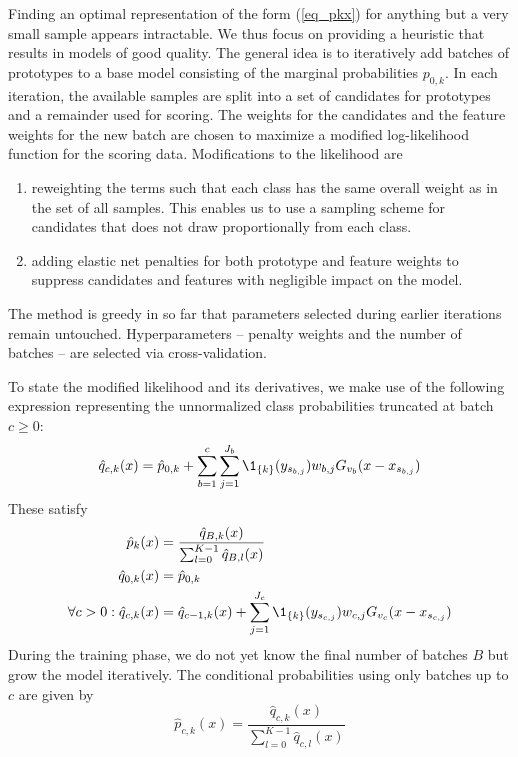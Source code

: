 %
Finding an optimal representation of the form (\ref{eq_pkx}) for anything but a very small sample appears intractable.
We thus focus on providing a heuristic that results in models of good quality.
The general idea is to iteratively add batches of prototypes to a base model consisting of the marginal probabilities $p_{0,k}$.
In each iteration, the available samples are split into a set of candidates for prototypes and a remainder used for scoring.
The weights for the candidates and the feature weights for the new batch are chosen to maximize a modified log-likelihood function for the scoring data.
Modifications to the likelihood are
%
\begin{enumerate}
\item reweighting the terms such that each class has the same overall weight as in the set of all samples.
This enables us to use a sampling scheme for candidates that does not draw proportionally from each class.
%
\item adding elastic net penalties for both prototype and feature weights to suppress candidates and features with negligible impact on the model.
\end{enumerate}
%
The method is greedy in so far that parameters selected during earlier iterations remain untouched.
Hyperparameters -- penalty weights and the number of batches -- are selected via cross-validation.\par
%
To state the modified likelihood and its derivatives, we make use of the following expression representing the unnormalized class probabilities truncated at batch $c\geq0$:
%
\begin{equation}
\hat{q}_{c,k}(x)=\hat{p}_{0,k}
+\sum_{b=1}^c\sum_{j=1}^{J_b}\1_{\{k\}}(y_{s_{b,j}})w_{b,j}G_{v_b}(x-x_{s_{b,j}})
\label{eq_qckx}
\end{equation}
%
These satisfy
%
\begin{align}
\hat{p}_{k}(x)&=\frac{\hat{q}_{B,k}(x)}{\sum_{l=0}^{K-1}\hat{q}_{B,l}(x)}\label{eq_q_properties}\\
\hat{q}_{0,k}(x)&=\hat{p}_{0,k}\notag\\
\forall c>0:\hat{q}_{c,k}(x)&
=\hat{q}_{c-1,k}(x)+\sum_{j=1}^{J_c}\1_{\{k\}}(y_{s_{c,j}})w_{c,j}G_{v_c}(x-x_{s_{c,j}})
\notag
\end{align}
%
During the training phase, we do not yet know the final number of batches $B$ but grow the model iteratively.
The conditional probabilities using only batches up to $c$ are given by
%
\begin{equation}
\hat{p}_{c,k}(x)=\frac{\hat{q}_{c,k}(x)}{\sum_{l=0}^{K-1}\hat{q}_{c,l}(x)}\label{eq_pckx}
\end{equation}
